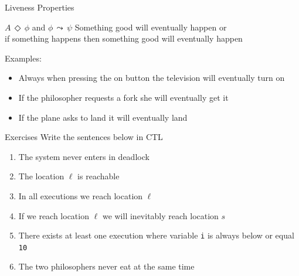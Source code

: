 \documentclass{beamer}
\begin{document}
\begin{slide}{Liveness Properties}

\begin{block}{$A\, \Diamond\, \phi$ and $\phi\, \leadsto \, \psi$}
Something \alert{good} will \alert{eventually} happen or \\
if something happens then something \alert{good}  will \alert{eventually}
happen

Examples:
\begin{itemize}
	\item \alert{Always} when pressing the on button the
		television will eventually turn on
        \item If the philosopher requests a fork she will \alert{eventually}
                get it
        \item If the plane asks to land it will \alert{eventually} land
\end{itemize}

\end{block}

\end{slide}

\begin{frame}{Exercises}
	Write the sentences below in CTL
	\begin{enumerate}
		\item The system never enters in deadlock
		\item The location $\ell$ is reachable
		\item In all executions we reach location $\ell$
		\item If we reach location $\ell$ we will inevitably reach
			location $s$
		\item There exists at least one execution where variable
			\texttt{i} is always below or equal \texttt{10}
		\item The two philosophers never eat at the same time
	\end{enumerate}
\end{frame}
\end{document}
